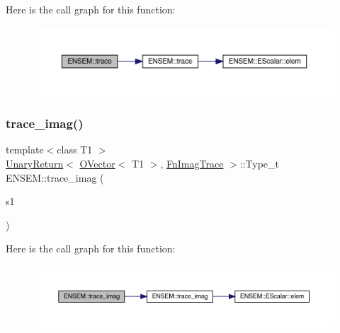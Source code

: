 Here is the call graph for this function\+:\nopagebreak
\begin{figure}[H]
\begin{center}
\leavevmode
\includegraphics[width=350pt]{da/d59/group__obsvector_ga7b30f87898883f11b8b43b5b3df77bea_cgraph}
\end{center}
\end{figure}
\mbox{\label{group__obsvector_ga42b95d27dd97c7484c4ddcc401aa305f}} 
\subsubsection{\texorpdfstring{trace\_imag()}{trace\_imag()}}
{\footnotesize\ttfamily template$<$class T1 $>$ \\
\mbox{\hyperlink{structENSEM_1_1UnaryReturn}{Unary\+Return}}$<$ \mbox{\hyperlink{classENSEM_1_1OVector}{O\+Vector}}$<$ T1 $>$, \mbox{\hyperlink{structENSEM_1_1FnImagTrace}{Fn\+Imag\+Trace}} $>$\+::Type\+\_\+t E\+N\+S\+E\+M\+::trace\+\_\+imag (\begin{DoxyParamCaption}\item[{const \mbox{\hyperlink{classENSEM_1_1OVector}{O\+Vector}}$<$ T1 $>$ \&}]{s1 }\end{DoxyParamCaption})\hspace{0.3cm}{\ttfamily [inline]}}

Here is the call graph for this function\+:\nopagebreak
\begin{figure}[H]
\begin{center}
\leavevmode
\includegraphics[width=350pt]{da/d59/group__obsvector_ga42b95d27dd97c7484c4ddcc401aa305f_cgraph}
\end{center}
\end{figure}
\mbox{\label{group__obsvector_ga89062217a6c2e9173699e36b88ed9b05}} 
